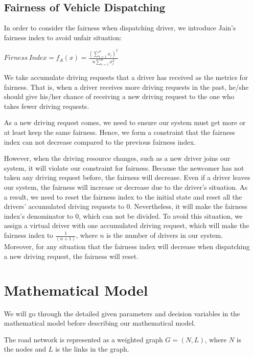 \subsection{Fairness of Vehicle Dispatching}

In order to consider the fairness when dispatching driver, we introduce Jain's fairness index to avoid unfair situation:

$Firness\ Index = f_A(x) = \frac{\left(\sum\limits_{i=1}^{n} x_i\right)^2}{n \sum\limits_{i=1}^{n} x_i^2}$

We take accumulate driving requests that a driver has received as the metrics for fairness. That is, when a driver receives more driving requests in the past, he/she should give his/her chance of receiving a new driving request to the one who takes fewer driving requests.

As a new driving request comes, we need to ensure our system must get more or at least keep the same fairness. Hence, we form a constraint that the fairness index can not decrease compared to the previous fairness index.

However, when the driving resource changes, such as a new driver joins our system, it will violate our constraint for fairness. Because the newcomer has not taken any driving request before, the fairness will decrease. Even if a driver leaves our system, the fairness will increase or decrease due to the driver's situation. As a result, we need to reset the fairness index to the initial state and reset all the drivers' accumulated driving requests to 0. Nevertheless, it will make the fairness index's denominator to 0, which can not be divided. To avoid this situation, we assign a virtual driver with one accumulated driving request, which will make the fairness index to $\frac{1}{(n+1)}$, where $n$ is the number of drivers in our system. Moreover, for any situation that the fairness index will decrease when dispatching a new driving request, the fairness will reset.

\newpage

\section{Mathematical Model}

We will go through the detailed given parameters and decision variables in the mathematical model before describing our mathematical model.

The road network is represented as a weighted graph $G = (N, L)$, where $N$ is the nodes and $L$ is the links in the graph.

